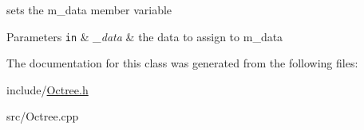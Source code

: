 sets the m\-\_\-data member variable 


\begin{DoxyParams}[1]{Parameters}
\mbox{\tt in}  & {\em \-\_\-data} & the data to assign to m\-\_\-data \\
\hline
\end{DoxyParams}


The documentation for this class was generated from the following files\-:\begin{DoxyCompactItemize}
\item 
include/\hyperlink{Octree_8h}{Octree.\-h}\item 
src/Octree.\-cpp\end{DoxyCompactItemize}
